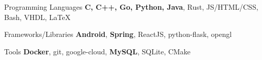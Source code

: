 

\begin{cvskills}

  \cvskill
    {Programming Languages} %
    {\textbf{C, C++, Go, Python, Java}, Rust, JS/HTML/CSS, Bash, VHDL, \LaTeX} %

  \cvskill
    {Frameworks/Libraries} %
    {\textbf{Android}, \textbf{Spring}, ReactJS, python-flask, opengl} %

  \cvskill
    {Tools} %
    {\textbf{Docker}, git, google-cloud, \textbf{MySQL}, SQLite, CMake} %

\end{cvskills}
